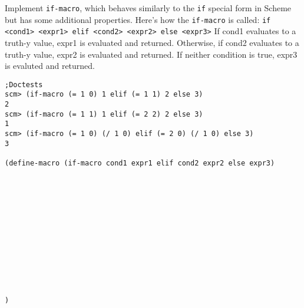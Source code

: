 \begin{blocksection}

\question Implement \texttt{if-macro}, which behaves similarly to the \texttt{if} special form in Scheme
but has some additional properties. Here's how the \texttt{if-macro} is called:
\newline
\texttt{if <cond1> <expr1> elif <cond2> <expr2> else <expr3>}
\newline
If cond1 evaluates to a truth-y value, expr1 is evaluated and returned. Otherwise, if cond2 evaluates
to a truth-y value, expr2 is evaluated and returned. If neither condition is true, expr3 is evaluted and returned.

\begin{lstlisting}
;Doctests
scm> (if-macro (= 1 0) 1 elif (= 1 1) 2 else 3)
2
scm> (if-macro (= 1 1) 1 elif (= 2 2) 2 else 3)
1
scm> (if-macro (= 1 0) (/ 1 0) elif (= 2 0) (/ 1 0) else 3)
3

(define-macro (if-macro cond1 expr1 elif cond2 expr2 else expr3)













)
\end{lstlisting}
\end{blocksection}
